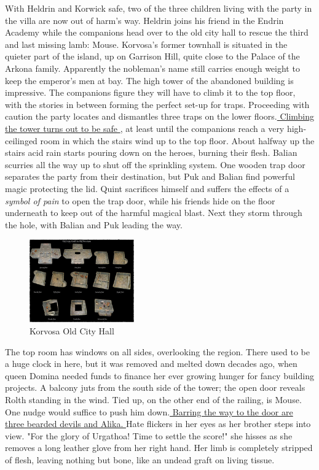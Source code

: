 With Heldrin and Korwick safe, two of the three children living with the party in the villa are now out of harm's way. Heldrin joins his friend in the Endrin Academy while the companions head over to the old city hall to rescue the third and last missing lamb: Mouse. Korvosa's former townhall is situated in the quieter part of the island, up on Garrison Hill, quite close to the Palace of the Arkona family. Apparently the nobleman's name still carries enough weight to keep the emperor's men at bay. The high tower of the abandoned building is impressive. The companions figure they will have to climb it to the top floor, with the stories in between forming the perfect set-up for traps. Proceeding with caution the party locates and dismantles three traps on the lower floors.\hyperref[fig:Korvosa-Old-City-Hall-559764706]{ Climbing the tower turns out to be safe } , at least until the companions reach a very high-ceilinged room in which the stairs wind up to the top floor. About halfway up the stairs acid rain starts pouring down on the heroes, burning their flesh. Balian scurries all the way up to shut off the sprinkling system. One wooden trap door separates the party from their destination, but Puk and Balian find powerful magic protecting the lid. Quint sacrifices himself and suffers the effects of a  {\itshape symbol of pain} to open the trap door, while his friends hide on the floor underneath to keep out of the harmful magical blast. Next they storm through the hole, with Balian and Puk leading the way. \\

\begin{figure}[h]
	\centering
	\includegraphics[width=0.4\textwidth]{images/Korvosa-Old-City-Hall-559764706_mod.jpg}
	\caption{Korvosa Old City Hall}
	\label{fig:Korvosa-Old-City-Hall-559764706}
\end{figure}

The top room has windows on all sides, overlooking the region. There used to be a huge clock in here, but it was removed and melted down decades ago, when queen Domina needed funds to finance her ever growing hunger for fancy building projects. A balcony juts from the south side of the tower; the open door reveals Rolth standing in the wind. Tied up, on the other end of the railing, is Mouse. One nudge would suffice to push him down.\hyperref[fig:Final-showdown-with-Rolth-and-Alika-559765837]{ Barring the way to the door are three bearded devils and Alika. } Hate flickers in her eyes as her brother steps into view. "For the glory of Urgathoa! Time to settle the score!" she hisses as she removes a long leather glove from her right hand. Her limb is completely stripped of flesh, leaving nothing but bone, like an undead graft on living tissue. \\

